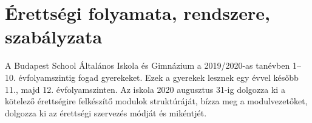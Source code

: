 \section{Érettségi folyamata, rendszere, szabályzata}
\label{sec:erettsegi_kesobb}
A Budapest School Általános Iskola és Gimnázium a 2019/2020-as tanévben 1--10. évfolyamszintig fogad gyerekeket. Ezek a gyerekek lesznek egy évvel később 11., majd 12. évfolyamszinten. Az iskola 2020 augusztus 31-ig dolgozza ki a kötelező érettségire felkészítő modulok struktúráját, bízza meg a modulvezetőket, dolgozza ki az érettségi szervezés módját és mikéntjét. 